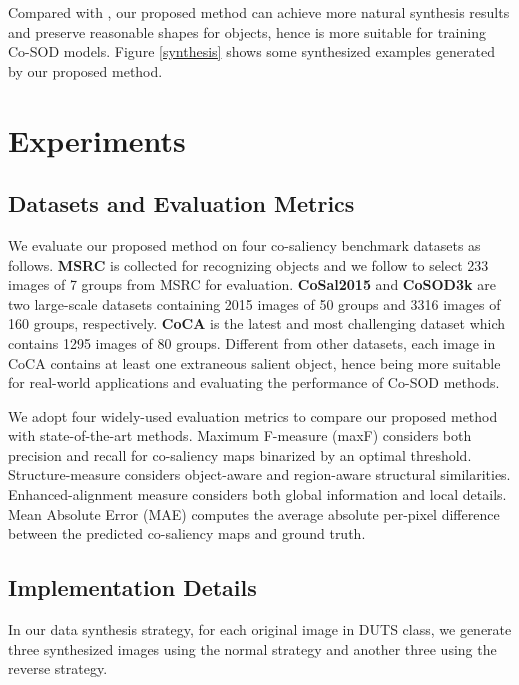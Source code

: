 \documentclass[10pt,twocolumn,letterpaper]{article}
\begin{document}
Compared with \cite{zhang2020gicd}, our proposed method can achieve more natural synthesis results and preserve reasonable shapes for objects, hence is more suitable for training Co-SOD models. Figure \ref{synthesis} shows some synthesized examples generated by our proposed method.

\section{Experiments}

\subsection{Datasets and Evaluation Metrics}

We evaluate our proposed method on four co-saliency benchmark datasets as follows. \textbf{MSRC} \cite{winn2005object} is collected for recognizing objects and we follow \cite{zhang2016detection, fu2013cluster} to select 233 images of 7 groups from MSRC for evaluation.
\textbf{CoSal2015} \cite{zhang2015co} and \textbf{CoSOD3k} \cite{fan2020taking} are two large-scale datasets containing 2015 images of 50 groups and 3316 images of 160 groups, respectively.
\textbf{CoCA} \cite{zhang2020gicd} is the latest and most challenging dataset which contains 1295 images of 80 groups. Different from other datasets, each image in CoCA contains at least one extraneous salient object, hence being more suitable for real-world applications and evaluating the performance of Co-SOD methods.

We adopt four widely-used evaluation metrics to compare our proposed method with state-of-the-art methods. Maximum F-measure (maxF) considers both precision and recall for co-saliency maps binarized by an optimal threshold. Structure-measure  \cite{fan2017structure} considers object-aware and region-aware structural similarities. Enhanced-alignment measure  \cite{Fan2018Enhanced} considers both global information and local details. Mean Absolute Error (MAE) computes the average absolute per-pixel difference between the predicted co-saliency maps and ground truth.

\subsection{Implementation Details}
In our data synthesis strategy, for each original image in DUTS class,
we generate three synthesized images using the normal strategy and another three using the reverse strategy.
\end{document}
